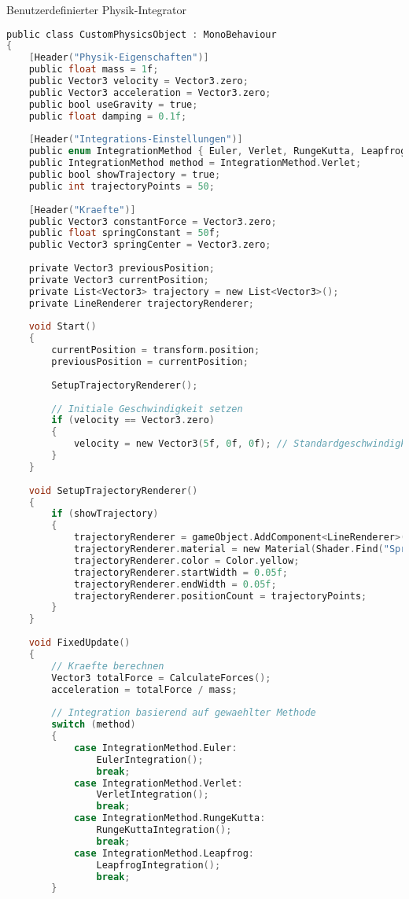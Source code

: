 \begin{code}{Benutzerdefinierter Physik-Integrator}
\begin{lstlisting}[language=C, style=basesmol]
public class CustomPhysicsObject : MonoBehaviour 
{
    [Header("Physik-Eigenschaften")]
    public float mass = 1f;
    public Vector3 velocity = Vector3.zero;
    public Vector3 acceleration = Vector3.zero;
    public bool useGravity = true;
    public float damping = 0.1f;
    
    [Header("Integrations-Einstellungen")]
    public enum IntegrationMethod { Euler, Verlet, RungeKutta, Leapfrog }
    public IntegrationMethod method = IntegrationMethod.Verlet;
    public bool showTrajectory = true;
    public int trajectoryPoints = 50;
    
    [Header("Kraefte")]
    public Vector3 constantForce = Vector3.zero;
    public float springConstant = 50f;
    public Vector3 springCenter = Vector3.zero;
    
    private Vector3 previousPosition;
    private Vector3 currentPosition;
    private List<Vector3> trajectory = new List<Vector3>();
    private LineRenderer trajectoryRenderer;
    
    void Start() 
    {
        currentPosition = transform.position;
        previousPosition = currentPosition;
        
        SetupTrajectoryRenderer();
        
        // Initiale Geschwindigkeit setzen
        if (velocity == Vector3.zero) 
        {
            velocity = new Vector3(5f, 0f, 0f); // Standardgeschwindigkeit
        }
    }
    
    void SetupTrajectoryRenderer() 
    {
        if (showTrajectory) 
        {
            trajectoryRenderer = gameObject.AddComponent<LineRenderer>();
            trajectoryRenderer.material = new Material(Shader.Find("Sprites/Default"));
            trajectoryRenderer.color = Color.yellow;
            trajectoryRenderer.startWidth = 0.05f;
            trajectoryRenderer.endWidth = 0.05f;
            trajectoryRenderer.positionCount = trajectoryPoints;
        }
    }
    
    void FixedUpdate() 
    {
        // Kraefte berechnen
        Vector3 totalForce = CalculateForces();
        acceleration = totalForce / mass;
        
        // Integration basierend auf gewaehlter Methode
        switch (method) 
        {
            case IntegrationMethod.Euler:
                EulerIntegration();
                break;
            case IntegrationMethod.Verlet:
                VerletIntegration();
                break;
            case IntegrationMethod.RungeKutta:
                RungeKuttaIntegration();
                break;
            case IntegrationMethod.Leapfrog:
                LeapfrogIntegration();
                break;
        }
        

\end{lstlisting}
\end{code}
